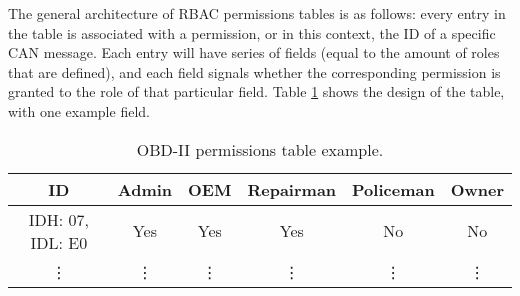 The general architecture of RBAC permissions tables is as follows: every entry in the table is associated with a permission, or in this context, the ID of a specific CAN message. Each entry will have series of fields (equal to the amount of roles that are defined), and each field signals whether the corresponding permission is granted to the role of that particular field. Table \ref{table:2} shows the design of the table, with one example field.

\begin{table}[]
	\begin{tabular}{|c|c|c|c|c|c|}
		\hline
		\rowcolor[HTML]{9B9B9B} ID & Admin & OEM & Repairman & Policeman & Owner \\ \hline
		\cellcolor[HTML]{9B9B9B} IDH: 07, IDL: E0 & Yes & Yes & Yes & No & No \\ \hline
		\cellcolor[HTML]{9B9B9B} \vdots & \vdots & \vdots & \vdots & \vdots & \vdots
	\end{tabular}
	\caption{OBD-II permissions table example.}
	\label{table:2}
\end{table}

